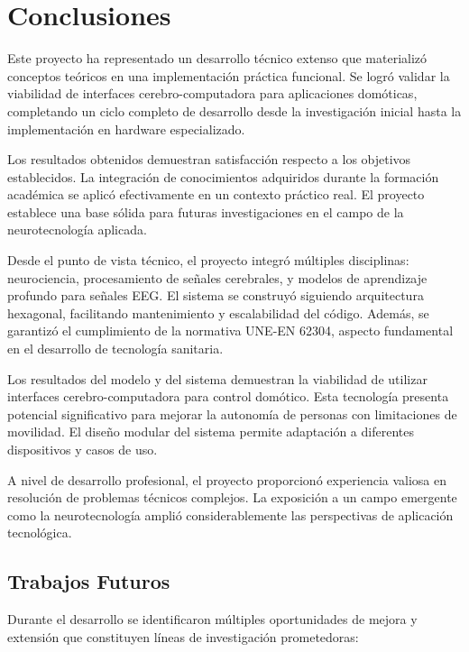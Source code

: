 \chapter{Conclusiones}

Este proyecto ha representado un desarrollo técnico extenso que materializó conceptos teóricos en una implementación práctica funcional. Se logró validar la viabilidad de interfaces cerebro-computadora para aplicaciones domóticas, completando un ciclo completo de desarrollo desde la investigación inicial hasta la implementación en hardware especializado.

Los resultados obtenidos demuestran satisfacción respecto a los objetivos establecidos. La integración de conocimientos adquiridos durante la formación académica se aplicó efectivamente en un contexto práctico real. El proyecto establece una base sólida para futuras investigaciones en el campo de la neurotecnología aplicada.

Desde el punto de vista técnico, el proyecto integró múltiples disciplinas: neurociencia, procesamiento de señales cerebrales, y modelos de aprendizaje profundo para señales EEG. El sistema se construyó siguiendo arquitectura hexagonal, facilitando mantenimiento y escalabilidad del código. Además, se garantizó el cumplimiento de la normativa UNE-EN 62304, aspecto fundamental en el desarrollo de tecnología sanitaria.

Los resultados del modelo y del sistema demuestran la viabilidad de utilizar interfaces cerebro-computadora para control domótico. Esta tecnología presenta potencial significativo para mejorar la autonomía de personas con limitaciones de movilidad. El diseño modular del sistema permite adaptación a diferentes dispositivos y casos de uso.

A nivel de desarrollo profesional, el proyecto proporcionó experiencia valiosa en resolución de problemas técnicos complejos. La exposición a un campo emergente como la neurotecnología amplió considerablemente las perspectivas de aplicación tecnológica.

\newpage
\section{Trabajos Futuros}

Durante el desarrollo se identificaron múltiples oportunidades de mejora y extensión que constituyen líneas de investigación prometedoras:

